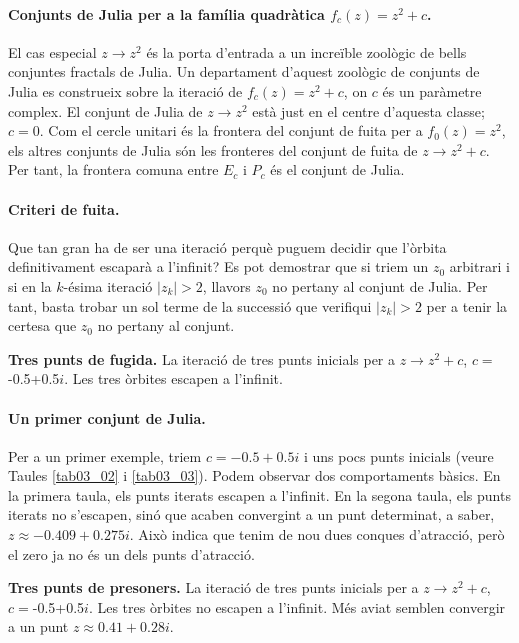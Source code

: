 \documentclass[12pt,a4paper]{report}
\begin{document}
\paragraph{Conjunts de Julia per a la família quadràtica $f_{c}(z)=z^{2}+c$.}
El cas especial $z\rightarrow z^{2}$ és la porta d'entrada a un increïble zoològic de bells conjuntes fractals de Julia. Un departament d'aquest zoològic de conjunts de Julia es construeix sobre la iteració de $f_{c}(z)=z^{2}+c$, on $c$ és un paràmetre complex. El conjunt de Julia de $z\rightarrow z^{2}$ està just en el centre d'aquesta classe; $c=0$. Com el cercle unitari és la frontera del conjunt de fuita per a $f_{0}(z)=z^{2}$, els altres conjunts de Julia són les fronteres del conjunt de fuita de $z\rightarrow z^{2}+c$. Per tant, la frontera comuna entre $E_c$ i $P_c$ és el conjunt de Julia.

\paragraph{Criteri de fuita.} Que tan gran ha de ser una iteració perquè puguem decidir que l'òrbita definitivament escaparà a l'infinit? Es pot demostrar \cite[p.~738]{ChaosFractal} que si triem un $z_0$ arbitrari i si en la $k$-ésima iteració $|z_k|>2$, llavors $z_0$ no pertany al conjunt de Julia. Per tant, basta trobar un sol terme de la successió que verifiqui $|z_{k}|>2$ per a tenir la certesa que $z_0$ no pertany al conjunt.

\begin{table}[!ht]
\centering
{}
\caption{\textbf{Tres punts de fugida.} La iteració de tres punts inicials per a $z\rightarrow z^{2}+c$, $c=$-0.5+0.5$i$. Les tres òrbites escapen a l'infinit.}
\label{tab03_02}
\end{table}

\paragraph{Un primer conjunt de Julia.} Per a un primer exemple, triem $c=-0.5+0.5i$ i uns pocs punts inicials (veure Taules \ref{tab03_02} i \ref{tab03_03}). Podem observar dos comportaments bàsics. En la primera taula, els punts iterats escapen a l'infinit. En la segona taula, els punts iterats no s'escapen, sinó que acaben convergint a un punt determinat, a saber, $z\approx -0.409+0.275i$. Això indica que tenim de nou dues conques d'atracció, però el zero ja no és un dels punts d'atracció. 

\begin{table}[!ht]
\centering
{}
\caption{\textbf{Tres punts de presoners.} La iteració de tres punts inicials per a $z\rightarrow z^{2}+c$, $c=$-0.5+0.5$i$. Les tres òrbites no escapen a l'infinit. Més aviat semblen convergir a un punt $z\approx 0.41+0.28i$.}
\label{tab03_03}
\end{table}
\end{document}
